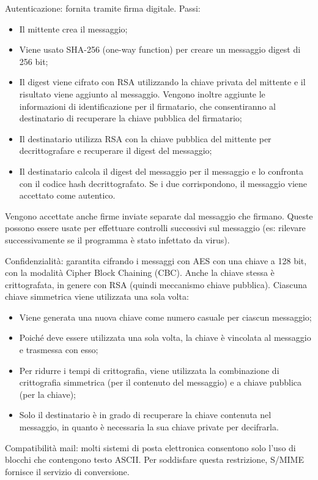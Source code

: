 Autenticazione: fornita tramite firma digitale. Passi:
\begin{itemize}
    \item Il mittente crea il messaggio;
	\item Viene usato SHA-256 (one-way function) per creare un messaggio digest di 256 bit;
	\item Il digest viene cifrato con RSA utilizzando la chiave privata del mittente e il risultato viene aggiunto al messaggio. Vengono inoltre aggiunte le informazioni di identificazione per il firmatario, che consentiranno al destinatario di recuperare la chiave pubblica del firmatario;
	\item Il destinatario utilizza RSA con la chiave pubblica del mittente per decrittografare e recuperare il digest del messaggio;
	\item Il destinatario calcola il digest del messaggio per il messaggio e lo confronta con il codice hash decrittografato. Se i due corrispondono, il messaggio viene accettato come autentico.
\end{itemize}

Vengono accettate anche firme inviate separate dal messaggio che firmano. Queste possono essere usate per effettuare controlli successivi sul messaggio (es: rilevare successivamente se il programma è stato infettato da virus).

Confidenzialità: garantita cifrando i messaggi con AES con una chiave a 128 bit, con la modalità Cipher Block Chaining (CBC). Anche la chiave stessa è crittografata, in genere con RSA (quindi meccanismo chiave pubblica). Ciascuna chiave simmetrica viene utilizzata una sola volta:
\begin{itemize}
    \item Viene generata una nuova chiave come numero casuale per ciascun messaggio;
	\item Poiché deve essere utilizzata una sola volta, la chiave è vincolata al messaggio e trasmessa con esso;
	\item Per ridurre i tempi di crittografia, viene utilizzata la combinazione di crittografia simmetrica (per il contenuto del messaggio) e a chiave pubblica (per la chiave);
	\item Solo il destinatario è in grado di recuperare la chiave contenuta nel messaggio, in quanto è necessaria la sua chiave private per decifrarla.
\end{itemize}
	
Compatibilità mail: molti sistemi di posta elettronica consentono solo l'uso di blocchi che contengono testo ASCII. Per soddisfare questa restrizione, S/MIME fornisce il servizio di conversione.

